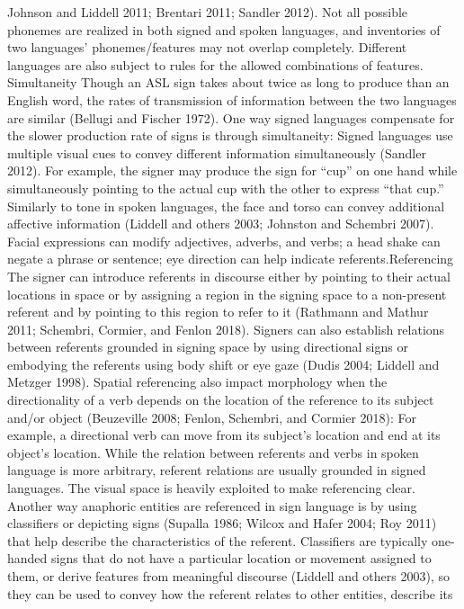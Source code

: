 Johnson and Liddell 2011; Brentari 2011; Sandler 2012). Not all possible phonemes are realized
in both signed and spoken languages, and inventories of two languages’ phonemes/features may
not overlap completely. Different languages are also subject to rules for the allowed combinations
of features.
Simultaneity
Though an ASL sign takes about twice as long to produce than an English word, the rates of
transmission of information between the two languages are similar (Bellugi and Fischer 1972).
One way signed languages compensate for the slower production rate of signs is through
simultaneity: Signed languages use multiple visual cues to convey different information
simultaneously (Sandler 2012). For example, the signer may produce the sign for “cup” on one
hand while simultaneously pointing to the actual cup with the other to express “that cup.” Similarly
to tone in spoken languages, the face and torso can convey additional affective
information (Liddell and others 2003; Johnston and Schembri 2007). Facial expressions can
modify adjectives, adverbs, and verbs; a head shake can negate a phrase or sentence; eye direction
can help indicate referents.Referencing
The signer can introduce referents in discourse either by pointing to their actual locations in space
or by assigning a region in the signing space to a non-present referent and by pointing to this region
to refer to it (Rathmann and Mathur 2011; Schembri, Cormier, and Fenlon 2018). Signers can also
establish relations between referents grounded in signing space by using directional signs or
embodying the referents using body shift or eye gaze (Dudis 2004; Liddell and Metzger 1998).
Spatial referencing also impact morphology when the directionality of a verb depends on the
location of the reference to its subject and/or object (Beuzeville 2008; Fenlon, Schembri, and
Cormier 2018): For example, a directional verb can move from its subject’s location and end at its
object’s location. While the relation between referents and verbs in spoken language is more
arbitrary, referent relations are usually grounded in signed languages. The visual space is heavily
exploited to make referencing clear.
Another way anaphoric entities are referenced in sign language is by using classifiers or depicting
signs (Supalla 1986; Wilcox and Hafer 2004; Roy 2011) that help describe the characteristics of
the referent. Classifiers are typically one-handed signs that do not have a particular location or
movement assigned to them, or derive features from meaningful discourse (Liddell and
others 2003), so they can be used to convey how the referent relates to other entities, describe its
